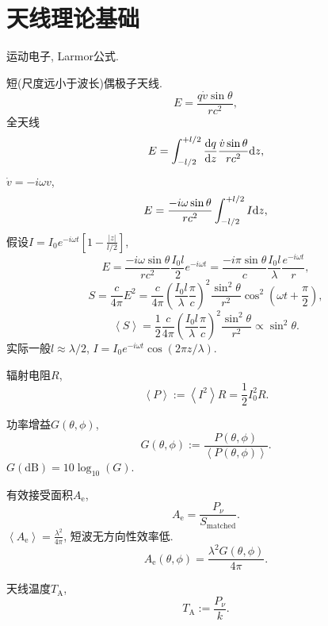 \chapter{天线理论基础}

运动电子, Larmor公式.

短(尺度远小于波长)偶极子天线.
\begin{equation}
    E=\frac{q\dot{v}\sin\theta}{rc^2},
\end{equation}
全天线
\begin{equation}
    E=\int_{-l/2}^{+l/2}\frac{\mathrm{d} q}{\mathrm{d} z}\frac{\dot{v}\sin\theta}{rc^2}\mathrm{d} z,
\end{equation}
$\dot{v}=-i\omega v$,
\begin{equation}
    E=\frac{-i\omega\sin\theta}{rc^2}\int_{-l/2}^{+l/2}I\mathrm{d} z,
\end{equation}
假设$I=I_0e^{-i\omega t}\left[1-\frac{\left\lvert z\right\rvert }{l/2}\right]$,
\begin{equation}
    E=\frac{-i\omega\sin\theta}{rc^2}\frac{I_0l}{2}e^{-i\omega t}=\frac{-i\pi\sin\theta}{c}\frac{I_0l}{\lambda}\frac{e^{-i\omega t}}{r},
\end{equation}
\begin{equation}
    S=\frac{c}{4\pi}E^2=\frac{c}{4\pi}\left(\frac{I_0l}{\lambda}\frac{\pi}{c}\right)^2\frac{\sin^2\theta}{r^2}\cos^2(\omega t+\frac{\pi}{2}),
\end{equation}
\begin{equation}
    \left\langle S\right\rangle=\frac{1}{2}\frac{c}{4\pi}\left(\frac{I_0l}{\lambda}\frac{\pi}{c}\right)^2\frac{\sin^2\theta}{r^2}\propto\sin^2\theta.
\end{equation}
实际一般$l\approx\lambda/2$, $I=I_0e^{-i\omega t}\cos(2\pi z/\lambda)$.

辐射电阻$R$,
\begin{equation}
    \left\langle P\right\rangle := \left\langle I^2\right\rangle R=\frac{1}{2}I_0^2R.
\end{equation}

功率增益$G(\theta, \phi)$,
\begin{equation}
    G(\theta, \phi):=\frac{P(\theta, \phi)}{\left\langle P(\theta, \phi)\right\rangle }.
\end{equation}
$G(\text{dB})=10\log_{10}(G)$.

有效接受面积$A_\text{e}$,
\begin{equation}
    A_\text{e}=\frac{P_\nu}{S_\text{matched}}.
\end{equation}
$\left\langle A_\text{e}\right\rangle =\frac{\lambda^2}{4\pi}$, 短波无方向性效率低.
\begin{equation}
    A_\text{e}(\theta, \phi)=\frac{\lambda^2G(\theta, \phi)}{4\pi}.
\end{equation}

天线温度$T_\text{A}$,
\begin{equation}
    T_\text{A}:=\frac{P_\nu}{k}.
\end{equation}

